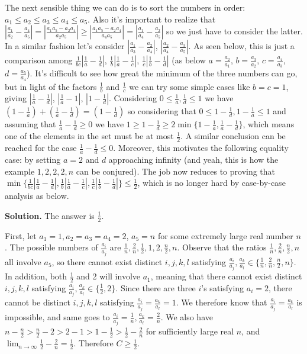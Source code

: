 \documentclass[11pt,a4paper]{article}
\begin{document}
\begin{itemize}
The next sensible thing we can do is to sort the numbers in order: 
$a_1\le a_2\le a_3\le a_4\le a_5$. 
Also it's important to realize that $|\frac{a_1}{a_2}-\frac{a_4}{a_5}|=|\frac{a_1a_5-a_2a_4}{a_2a_5}|\ge |\frac{a_1a_5-a_2a_4}{a_4a_5}|=|\frac{a_1}{a_4}-\frac{a_2}{a_5}|$ so we just have to consider the latter. 
In a similar fashion let's consider $|\frac{a_1}{a_3}-\frac{a_2}{a_4}|$, 
$|\frac{a_2}{a_4}-\frac{a_3}{a_5}|$. 
As seen below, this is just a comparison among 
$\frac 1{bc}|\frac 1a-\frac 1d|$, $\frac 1b|\frac 1a-\frac 1c|$, $\frac 1c|\frac 1b-\frac 1d|$ 
(as below  $a=\frac {a_2}{a_1}$, 
$b=\frac {a_3}{a_2}$, 
$c=\frac {a_4}{a_3}$, 
$d=\frac {a_5}{a_4}$). 
It's difficult to see how great the minimum of the three numbers can go, 
but in light of the factors $\frac 1b$ and $\frac 1c$ we can try some simple cases like $b=c=1$, 
giving $|\frac 1a-\frac 1d|$, $|\frac 1a-1|$, $|1-\frac 1d|$. 
Considering $0\le \frac 1a, \frac 1d\le 1$ we have 
$(1-\frac 1a)+(\frac 1a-\frac 1d)=(1-\frac 1d)$ 
so considering that $0\le 1-\frac 1d, 1-\frac 1a\le 1$ and assuming that $\frac 1a-\frac 1d\ge 0$ we have 
$1\ge 1-\frac 1d\ge 2\min\{1-\frac 1a, \frac 1a-\frac 1d\}$, which means one of the elements in the set must be at most $\frac 12$. 
A similar conclusion can be reached for the case $\frac 1a-\frac 1d\le 0$. 
Moreover, this motivates the following equality case: by setting $a=2$ and $d$ approaching infinity (and yeah, this is how the example $1, 2, 2, 2, n$ can be conjured). 
The job now reduces to proving that $\min \{\frac 1{bc}|\frac 1a-\frac 1d|, \frac 1b|\frac 1a-\frac 1c|, \frac 1c|\frac 1b-\frac 1d|\}\le \frac 12$, which is no longer hard by case-by-case analysis as below. 

\textbf{Solution.} The answer is $\frac 12$. 

First, let $a_1=1, a_2=a_3=a_4=2$, $a_5=n$ for some extremely large real number $n$. 
The possible numbers of $\frac {a_i}{a_j}$ are $\frac 1n, \frac 2n, \frac 12, 1, 2, \frac n2, n$. 
Observe that the ratios $\frac 1n, \frac 2n, \frac n2, n$ all involve $a_5$, so there cannot exist distinct $i, j, k, l$ satisfying 
$\frac{a_i}{a_j}, \frac {a_k}{a_l}\in\{\frac 1n, \frac 2n, \frac n2, n\}$. 
In addition, both $\frac 12$ and 2 will involve $a_1$, meaning that there cannot exist distinct $i, j, k, l$ satisfying 
$\frac{a_i}{a_j}, \frac {a_k}{a_l}\in\{\frac 12, 2\}$. 
Since there are three $i$'s satisfying $a_i=2$, there cannot be distinct $i,j,k,l$ satisfying $\frac{a_i}{a_j}=\frac {a_k}{a_l}=1$. 
We therefore know that  $\frac{a_i}{a_j}=\frac {a_k}{a_l}$ is impossible, 
and same goes to $\frac{a_i}{a_j}=\frac 1n, \frac {a_k}{a_l}=\frac 2n$. 
We also have $n-\frac n2> \frac n2 -2 > 2-1>1-\frac 12>\frac 12-\frac 2n$ for sufficiently large real $n$, 
and $\lim_{n\to\infty}\frac 12-\frac 2n=\frac 12$. 
Therefore $C\ge \frac 12$. 


\end{itemize}
\end{document}
